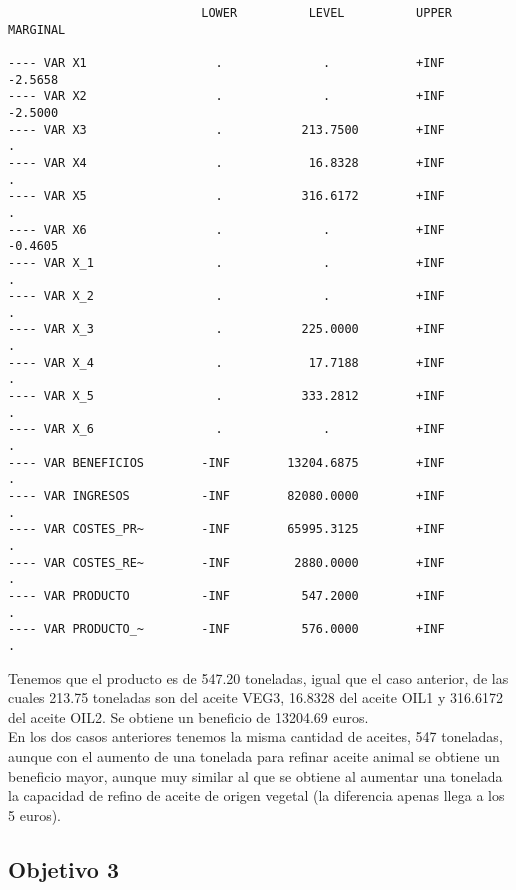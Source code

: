 \documentclass[12pt,a4paper,twoside,openright,titlepage,final]{article}
\begin{document}
\begin{verbatim}
                           LOWER          LEVEL          UPPER         MARGINAL

---- VAR X1                  .              .            +INF           -2.5658      
---- VAR X2                  .              .            +INF           -2.5000      
---- VAR X3                  .           213.7500        +INF             .          
---- VAR X4                  .            16.8328        +INF             .          
---- VAR X5                  .           316.6172        +INF             .          
---- VAR X6                  .              .            +INF           -0.4605      
---- VAR X_1                 .              .            +INF             .          
---- VAR X_2                 .              .            +INF             .          
---- VAR X_3                 .           225.0000        +INF             .          
---- VAR X_4                 .            17.7188        +INF             .          
---- VAR X_5                 .           333.2812        +INF             .          
---- VAR X_6                 .              .            +INF             .          
---- VAR BENEFICIOS        -INF        13204.6875        +INF             .          
---- VAR INGRESOS          -INF        82080.0000        +INF             .          
---- VAR COSTES_PR~        -INF        65995.3125        +INF             .          
---- VAR COSTES_RE~        -INF         2880.0000        +INF             .          
---- VAR PRODUCTO          -INF          547.2000        +INF             .          
---- VAR PRODUCTO_~        -INF          576.0000        +INF             .          
\end{verbatim}

Tenemos que el producto es de 547.20 toneladas, igual que el caso anterior, de las cuales 213.75 toneladas son del aceite VEG3, 16.8328 del aceite OIL1 y 316.6172 del aceite OIL2. Se obtiene un beneficio de 13204.69 euros.\\

En los dos casos anteriores tenemos la misma cantidad de aceites, 547 toneladas, aunque con el aumento de una tonelada para refinar aceite animal se obtiene un beneficio mayor, aunque muy similar al que se obtiene al aumentar una tonelada la capacidad de refino de aceite de origen vegetal (la diferencia apenas llega a los 5 euros).

\subsection{Objetivo 3}
\end{document}
